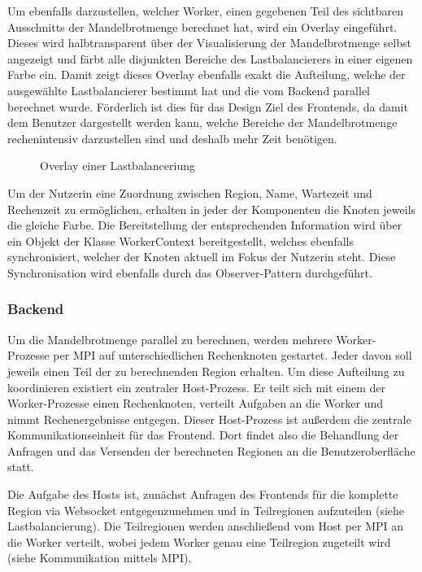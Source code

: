 Um ebenfalls darzustellen, welcher Worker, einen gegebenen Teil des sichtbaren Ausschnitts der Mandelbrotmenge berechnet hat, wird ein Overlay eingeführt. Dieses wird halbtransparent über der Visualisierung der Mandelbrotmenge selbst angezeigt und färbt alle disjunkten Bereiche des Lastbalancierers in einer eigenen Farbe ein. Damit zeigt dieses Overlay ebenfalls exakt die Aufteilung, welche der ausgewählte Lastbalancierer bestimmt hat und die vom Backend parallel berechnet wurde. Förderlich ist dies für das Design Ziel des Frontends, da damit dem Benutzer dargestellt werden kann, welche Bereiche der Mandelbrotmenge rechenintensiv darzustellen sind und deshalb mehr Zeit benötigen.

\begin{figure}
    \centering
        \caption{Overlay einer Lastbalanceriung}
    \label{fig:visualisierung_lastbalancierung}
\end{figure}

Um der Nutzerin eine Zuordnung zwischen Region, Name, Wartezeit und Rechenzeit zu ermöglichen, erhalten in jeder der Komponenten die Knoten jeweils die gleiche Farbe. Die Bereitstellung der entsprechenden Information wird über ein Objekt der Klasse WorkerContext bereitgestellt, welches ebenfalls synchronisiert, welcher der Knoten aktuell im Fokus der Nutzerin steht. Diese Synchronisation wird ebenfalls durch das Observer-Pattern durchgeführt.

\subsubsection{Backend}

Um die Mandelbrotmenge parallel zu berechnen, werden mehrere Worker-Prozesse per MPI auf unterschiedlichen Rechenknoten gestartet. Jeder davon soll jeweils einen Teil der zu berechnenden Region erhalten. Um diese Aufteilung zu koordinieren existiert ein zentraler Host-Prozess. Er teilt sich mit einem der Worker-Prozesse einen Rechenknoten, verteilt Aufgaben an die Worker und nimmt Rechenergebnisse entgegen. Dieser Host-Prozess ist außerdem die zentrale Kommunikationseinheit für das Frontend. Dort findet also die Behandlung der Anfragen und das Versenden der berechneten Regionen an die Benutzeroberfläche statt.

Die Aufgabe des Hosts ist, zunächst Anfragen des Frontends für die komplette Region via Websocket entgegenzunehmen und in Teilregionen aufzuteilen (siehe Lastbalancierung). Die Teilregionen werden anschließend vom Host per MPI an die Worker verteilt, wobei jedem Worker genau eine Teilregion zugeteilt wird (siehe Kommunikation mittels MPI).

